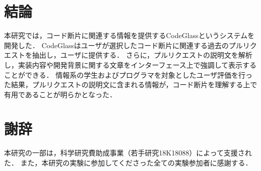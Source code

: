 \section{結論}

本研究では，コード断片に関連する情報を提供するCodeGlassというシステムを開発した．
CodeGlassはユーザが選択したコード断片に関連する過去のプルリクエストを抽出し，ユーザに提供する．
さらに，プルリクエストの説明文を解析し，実装内容や開発背景に関する文章をインターフェース上で強調して表示することができる．
情報系の学生およびプログラマを対象としたユーザ評価を行った結果，プルリクエストの説明文に含まれる情報が，コード断片を理解する上で有用であることが明らかとなった．



\section*{謝辞}
本研究の一部は，科学研究費助成事業（若手研究18K18088）によって支援された．
また，本研究の実験に参加してくださった全ての実験参加者に感謝する．
